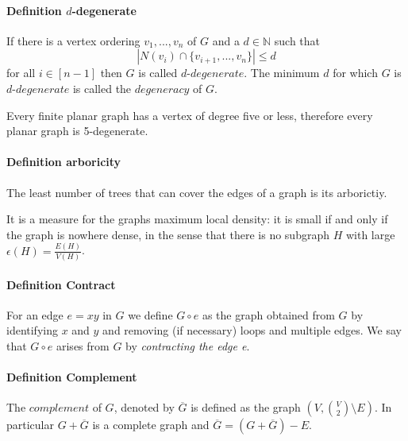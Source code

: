 \paragraph{Definition $d$-degenerate}
If there is a vertex ordering $ v_1,...,v_n $ of $ G $ and a $ d \in \mathbb{N} $
such that 
$$ |N(v_i) \cap \{v_{i+1},...,v_n\}| \leq d $$ 
for all $ i \in [n-1] $ then $ G $ is called $ d$-$degenerate $. The minimum
$ d $ for which $ G $ is $ d$-$degenerate $ is called the $ degeneracy $ of $ G $.

\smallskip
\noindent Every finite planar graph has a vertex of degree five or less, therefore 
every planar graph is 5-degenerate.

\paragraph{Definition arboricity}
The least number of trees that can cover the edges of a graph is its arborictiy.

\smallskip
\noindent It is a measure for the graphs maximum local density: it is small if and only if the 
graph is nowhere dense, in the sense that there is no subgraph $ H $ with large 
$ \epsilon(H) = \frac{E(H)}{V(H)} $.

\paragraph{Definition Contract}
For an edge $ e = xy $ in $ G $ we define $ G \circ e $ as the graph obtained from 
$ G $ by identifying $ x $ and $ y $ and removing (if necessary) loops and 
multiple edges. We say that $ G \circ e $ arises from $ G $ by 
\textit{contracting the edge e}.

\paragraph{Definition Complement}
The $ complement $ of $ G $, denoted by $ \overline{G} $ is defined as the graph
$ (V,\binom{V}{2} \setminus E)$. In particular $ G + \overline{G} $ is a 
complete graph and $ \overline{G} = (G + \overline{G}) - E $. 

